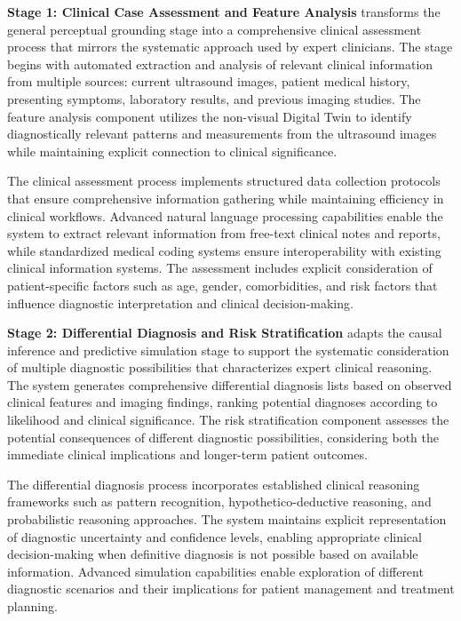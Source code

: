 \textbf{Stage 1: Clinical Case Assessment and Feature Analysis} transforms the general perceptual grounding stage into a comprehensive clinical assessment process that mirrors the systematic approach used by expert clinicians. The stage begins with automated extraction and analysis of relevant clinical information from multiple sources: current ultrasound images, patient medical history, presenting symptoms, laboratory results, and previous imaging studies. The feature analysis component utilizes the non-visual Digital Twin to identify diagnostically relevant patterns and measurements from the ultrasound images while maintaining explicit connection to clinical significance.

The clinical assessment process implements structured data collection protocols that ensure comprehensive information gathering while maintaining efficiency in clinical workflows. Advanced natural language processing capabilities enable the system to extract relevant information from free-text clinical notes and reports, while standardized medical coding systems ensure interoperability with existing clinical information systems. The assessment includes explicit consideration of patient-specific factors such as age, gender, comorbidities, and risk factors that influence diagnostic interpretation and clinical decision-making.

\textbf{Stage 2: Differential Diagnosis and Risk Stratification} adapts the causal inference and predictive simulation stage to support the systematic consideration of multiple diagnostic possibilities that characterizes expert clinical reasoning. The system generates comprehensive differential diagnosis lists based on observed clinical features and imaging findings, ranking potential diagnoses according to likelihood and clinical significance. The risk stratification component assesses the potential consequences of different diagnostic possibilities, considering both the immediate clinical implications and longer-term patient outcomes.

The differential diagnosis process incorporates established clinical reasoning frameworks such as pattern recognition, hypothetico-deductive reasoning, and probabilistic reasoning approaches. The system maintains explicit representation of diagnostic uncertainty and confidence levels, enabling appropriate clinical decision-making when definitive diagnosis is not possible based on available information. Advanced simulation capabilities enable exploration of different diagnostic scenarios and their implications for patient management and treatment planning.

